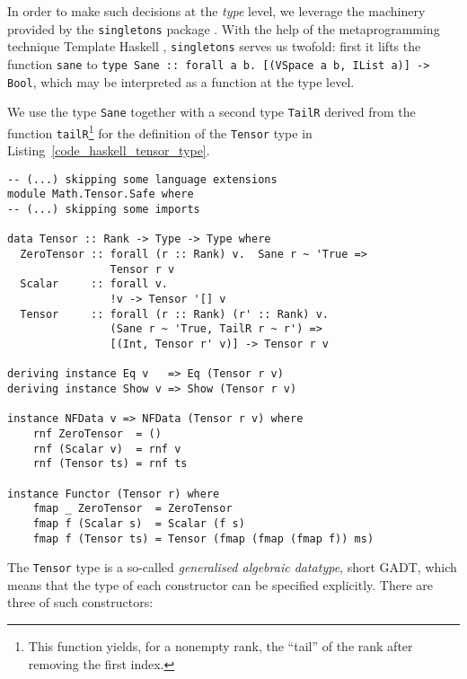 In order to make such decisions at the \emph{type} level, we leverage the machinery provided by the \texttt{singletons} package \cite{Eisenberg_2012}. With the help of the metaprogramming technique Template Haskell \cite{Sheard_2002}, \texttt{singletons} serves us twofold: first it lifts the function \texttt{sane} to \texttt{type Sane :: forall a b. [(VSpace a b, IList a)] -> Bool}, which may be interpreted as a function at the type level.

We use the type \texttt{Sane} together with a second type \texttt{TailR} derived from the function \texttt{tailR}\footnote{This function yields, for a nonempty rank, the ``tail'' of the rank after removing the first index.} for the definition of the \texttt{Tensor} type in Listing~\ref{code_haskell_tensor_type}.
\begin{code}
  \begin{verbatim}
-- (...) skipping some language extensions
module Math.Tensor.Safe where
-- (...) skipping some imports

data Tensor :: Rank -> Type -> Type where
  ZeroTensor :: forall (r :: Rank) v.  Sane r ~ 'True =>
                Tensor r v
  Scalar     :: forall v.
                !v -> Tensor '[] v
  Tensor     :: forall (r :: Rank) (r' :: Rank) v.
                (Sane r ~ 'True, TailR r ~ r') =>
                [(Int, Tensor r' v)] -> Tensor r v

deriving instance Eq v   => Eq (Tensor r v)
deriving instance Show v => Show (Tensor r v)

instance NFData v => NFData (Tensor r v) where
    rnf ZeroTensor  = ()
    rnf (Scalar v)  = rnf v
    rnf (Tensor ts) = rnf ts

instance Functor (Tensor r) where
    fmap _ ZeroTensor  = ZeroTensor
    fmap f (Scalar s)  = Scalar (f s)
    fmap f (Tensor ts) = Tensor (fmap (fmap (fmap f)) ms)
  \end{verbatim}
  \label{code_haskell_tensor_type}
\end{code}
The \texttt{Tensor} type is a so-called \emph{generalised algebraic datatype}, short GADT, which means that the type of each constructor can be specified explicitly. There are three of such constructors:
